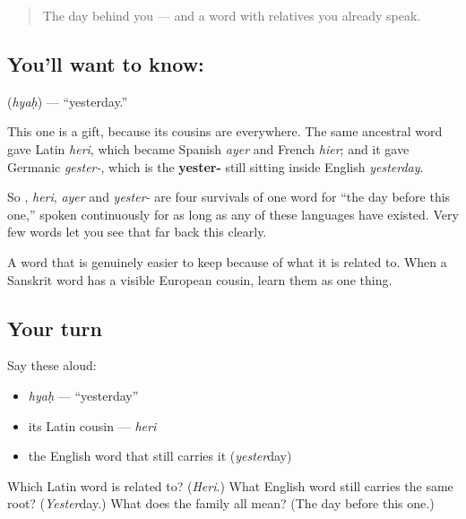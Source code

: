 \label{lesson:SA-C17-yesterday}



\begin{quote}
The day behind you — and a word with relatives you already speak.
\end{quote}

\subsection*{You'll want to know: }
\textbf{} (\emph{hyaḥ}) — \textquotedblleft{}yesterday.\textquotedblright{}

This one is a gift, because its cousins are everywhere. The same ancestral word gave Latin \emph{heri}, which became Spanish \emph{ayer} and French \emph{hier}; and it gave Germanic \emph{gester-}, which is the \textbf{yester-} still sitting inside English \emph{yesterday}.

So , \emph{heri}, \emph{ayer} and \emph{yester-} are four survivals of one word for \textquotedblleft{}the day before this one,\textquotedblright{} spoken continuously for as long as any of these languages have existed. Very few words let you see that far back this clearly.

\begin{grammarlens}[title={What you've built}]
A word that is genuinely easier to keep because of what it is related to. When a Sanskrit word has a visible European cousin, learn them as one thing.
\end{grammarlens}

\subsection*{Your turn}
Say these aloud:

\begin{itemize}
\raggedright
  \item \emph{hyaḥ} — \textquotedblleft{}yesterday\textquotedblright{}
  \item its Latin cousin — \emph{heri}
  \item the English word that still carries it (\emph{yester}day)
\end{itemize}

\begin{tcolorbox}[breakable,colback=teal!4,colframe=teal!35!black,title={Before you move on}]
Which Latin word is  related to? (\emph{Heri}.) What English word still carries the same root? (\emph{Yester}day.) What does the family all mean? (The day before this one.)
\end{tcolorbox}
